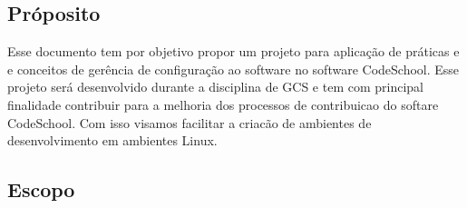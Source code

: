 \documentclass{article}
\begin{document}
\subsection{Próposito}
Esse documento tem por objetivo propor um projeto para aplicação de práticas e e conceitos de gerência de configuração ao software no software CodeSchool. Esse projeto será desenvolvido durante a disciplina de GCS e tem com principal finalidade contribuir para a melhoria dos processos de contribuicao do softare CodeSchool. Com isso visamos facilitar a criacão de ambientes de desenvolvimento em ambientes Linux. 
\subsection{Escopo}
\newpage
\end{document}
